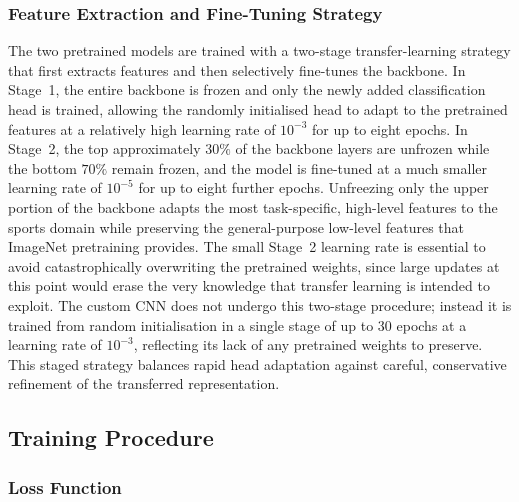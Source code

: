 \subsubsection{Feature Extraction and Fine-Tuning Strategy}
\label{subsubsec:method-finetune}

The two pretrained models are trained with a two-stage transfer-learning strategy that first extracts features and then selectively fine-tunes the backbone.
In Stage~1, the entire backbone is frozen and only the newly added classification head is trained, allowing the randomly initialised head to adapt to the pretrained features at a relatively high learning rate of $10^{-3}$ for up to eight epochs.
In Stage~2, the top approximately $30\%$ of the backbone layers are unfrozen while the bottom $70\%$ remain frozen, and the model is fine-tuned at a much smaller learning rate of $10^{-5}$ for up to eight further epochs.
Unfreezing only the upper portion of the backbone adapts the most task-specific, high-level features to the sports domain while preserving the general-purpose low-level features that ImageNet pretraining provides.
The small Stage~2 learning rate is essential to avoid catastrophically overwriting the pretrained weights, since large updates at this point would erase the very knowledge that transfer learning is intended to exploit.
The custom CNN does not undergo this two-stage procedure; instead it is trained from random initialisation in a single stage of up to $30$ epochs at a learning rate of $10^{-3}$, reflecting its lack of any pretrained weights to preserve.
This staged strategy balances rapid head adaptation against careful, conservative refinement of the transferred representation.

\subsection{Training Procedure}
\label{subsec:method-training}

\subsubsection{Loss Function}
\label{subsubsec:method-loss}


